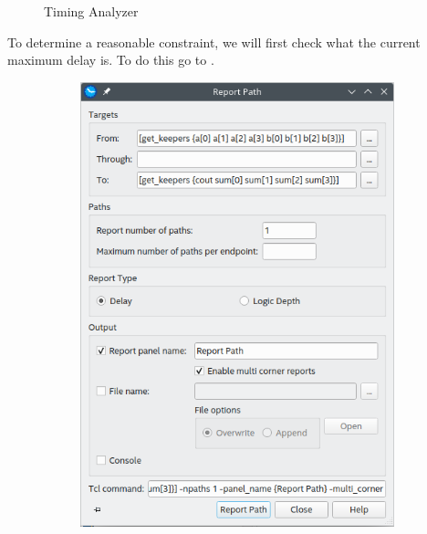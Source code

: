 \documentclass[12pt]{labmanual}
\begin{document}
\begin{minipage}[t][0.5\textheight][t]{\linewidth}
\begin{figure}[H]
    \caption{Timing Analyzer}
\end{figure}
\end{minipage}
\begin{minipage}[htbp!]{\linewidth}
\noindent
To determine a reasonable constraint, we will first check what the current maximum delay is. To do this go to . 
    \begin{minipage}[ht!]{0.5\linewidth}
    \begin{figure}[H]
    \centering
    \begin{subfigure}{\linewidth}
        \includegraphics[width=\linewidth]{reportpath.png}

\end{subfigure}
\end{figure}
\end{minipage}
\end{minipage}
\end{document}

